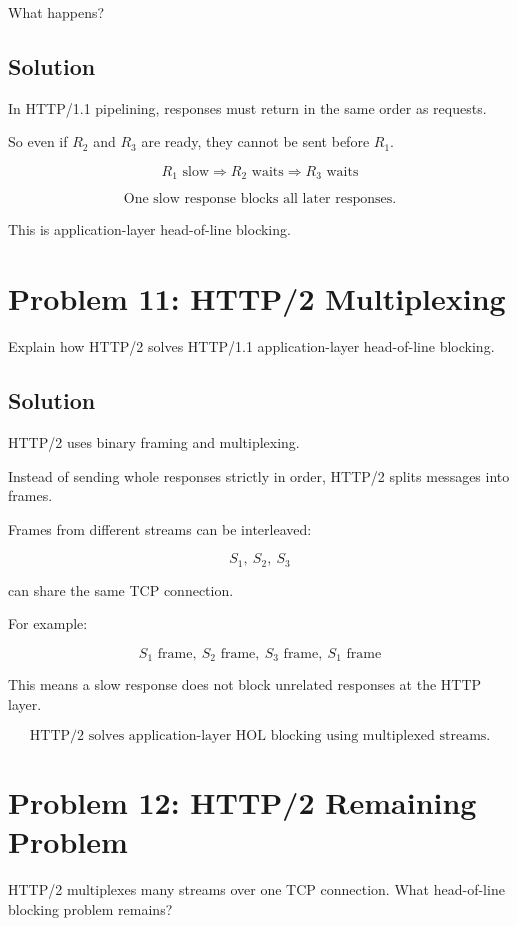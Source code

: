 \documentclass[12pt]{article}
\begin{document}
What happens?

\subsection*{Solution}

In HTTP/1.1 pipelining, responses must return in the same order as requests.

So even if \(R_2\) and \(R_3\) are ready, they cannot be sent before \(R_1\).

\[
R_1 \text{ slow} \Rightarrow R_2 \text{ waits} \Rightarrow R_3 \text{ waits}
\]

\[
\boxed{\text{One slow response blocks all later responses.}}
\]

This is application-layer head-of-line blocking.

\section*{Problem 11: HTTP/2 Multiplexing}

Explain how HTTP/2 solves HTTP/1.1 application-layer head-of-line blocking.

\subsection*{Solution}

HTTP/2 uses binary framing and multiplexing.

Instead of sending whole responses strictly in order, HTTP/2 splits messages into frames.

Frames from different streams can be interleaved:

\[
S_1,\ S_2,\ S_3
\]

can share the same TCP connection.

For example:

\[
S_1 \text{ frame},\ S_2 \text{ frame},\ S_3 \text{ frame},\ S_1 \text{ frame}
\]

This means a slow response does not block unrelated responses at the HTTP layer.

\[
\boxed{\text{HTTP/2 solves application-layer HOL blocking using multiplexed streams.}}
\]

\section*{Problem 12: HTTP/2 Remaining Problem}

HTTP/2 multiplexes many streams over one TCP connection. What head-of-line blocking problem remains?
\end{document}
